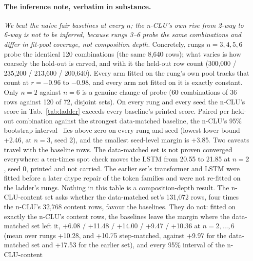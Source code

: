 \documentclass{article} %
\begin{document}
\paragraph{The inference note, verbatim in substance.} \emph{We beat the naive fair baselines at
every $n$; the n-CLU's own rise from 2-way to 6-way is not to be inferred, because rungs 3--6
probe the same combinations and differ in fit-pool coverage, not composition depth.} Concretely,
rungs $n=3,4,5,6$ probe the identical 120 combinations (the same 8,640 rows); what varies is how
coarsely the hold-out is carved, and with it the held-out row count (300,000 / 235,200 /
213,600 / 200,640). Every arm fitted on the rung's own pool tracks that count at
$r=-0.96$ to $-0.98$, and every arm not fitted on it is exactly constant.
Only $n=2$ against $n=6$ is a genuine change of probe (60 combinations of 36 rows against 120 of
72, disjoint sets). %
On every rung and every seed the n-CLU's score in Tab.~\ref{tab:ladder} exceeds every baseline's
printed score. Paired per held-out combination against the strongest data-matched baseline, the n-CLU's 95\% %
bootstrap interval~\citep{efron1979bootstrap} lies above zero on every rung and seed (lowest lower
bound +2.46, at $n=3$, seed 2), and the smallest seed-level margin is +3.85. Two caveats travel with %
the baseline rows. The data-matched set is not proven converged everywhere: a ten-times spot check %
moves the LSTM from 20.55 to 21.85 at $n=2$, seed 0, printed and not carried. The earlier set's %
transformer and LSTM were fitted before a later dtype repair of the
token families and were not re-fitted on the ladder's rungs. Nothing in this table is a
composition-depth result.
The n-CLU-content set asks whether the data-matched set's 131,072 rows, four times the n-CLU's
32,768 content rows, favour the baselines. They do not: fitted on exactly the n-CLU's content rows, %
the baselines leave the margin where the data-matched set left it, +6.08 / +11.48 / +14.00 / +9.47 / %
+10.36 at $n=2,\ldots,6$ (mean over rungs +10.28, and +10.75 step-matched, against +9.97 for the %
data-matched set and +17.53 for the earlier set), and every 95\% interval of the n-CLU-content %
\end{document}
